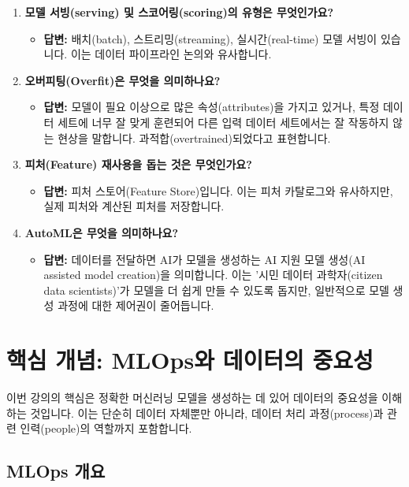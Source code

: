 \documentclass[11pt,a4paper]{article}
\begin{document}
\begin{enumerate}
    \item \textbf{모델 서빙(serving) 및 스코어링(scoring)의 유형은 무엇인가요?}
    \begin{itemize}
        \item \textbf{답변:} 배치(batch), 스트리밍(streaming), 실시간(real-time) 모델 서빙이 있습니다. 이는 데이터 파이프라인 논의와 유사합니다.
    \end{itemize}

    \item \textbf{오버피팅(Overfit)은 무엇을 의미하나요?}
    \begin{itemize}
        \item \textbf{답변:} 모델이 필요 이상으로 많은 속성(attributes)을 가지고 있거나, 특정 데이터 세트에 너무 잘 맞게 훈련되어 다른 입력 데이터 세트에서는 잘 작동하지 않는 현상을 말합니다. 과적합(overtrained)되었다고 표현합니다.
    \end{itemize}

    \item \textbf{피처(Feature) 재사용을 돕는 것은 무엇인가요?}
    \begin{itemize}
        \item \textbf{답변:} 피처 스토어(Feature Store)입니다. 이는 피처 카탈로그와 유사하지만, 실제 피처와 계산된 피처를 저장합니다.
    \end{itemize}

    \item \textbf{AutoML은 무엇을 의미하나요?}
    \begin{itemize}
        \item \textbf{답변:} 데이터를 전달하면 AI가 모델을 생성하는 AI 지원 모델 생성(AI assisted model creation)을 의미합니다. 이는 '시민 데이터 과학자(citizen data scientists)'가 모델을 더 쉽게 만들 수 있도록 돕지만, 일반적으로 모델 생성 과정에 대한 제어권이 줄어듭니다.
    \end{itemize}
\end{enumerate}

\newpage
\section{핵심 개념: MLOps와 데이터의 중요성}

이번 강의의 핵심은 정확한 머신러닝 모델을 생성하는 데 있어 데이터의 중요성을 이해하는 것입니다. 이는 단순히 데이터 자체뿐만 아니라, 데이터 처리 과정(process)과 관련 인력(people)의 역할까지 포함합니다.

\subsection{MLOps 개요}
\end{document}
